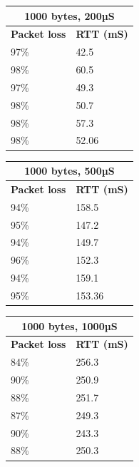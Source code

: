 \documentclass[11pt]{article}
\begin{document}
\begin{enumerate}[label=(\alph*)]
{	
\begin{tabular}{|l|l|}
\multicolumn{2}{c}{1000 bytes, 200µS} \\
\hline
\textbf{Packet loss} & \textbf{RTT (mS)} \\ \hline
97\% & 42.5 \\
98\% & 60.5 \\
97\% & 49.3 \\
98\% & 50.7 \\
98\% & 57.3 \\
\hline
98\% & 52.06 \\ 
\hline
\end{tabular}
\begin{tabular}{|l|l|}
\multicolumn{2}{c}{1000 bytes, 500µS} \\
\hline
\textbf{Packet loss} & \textbf{RTT (mS)} \\ \hline
94\% & 158.5 \\
95\% & 147.2 \\
94\% & 149.7 \\
96\% & 152.3 \\
94\% & 159.1 \\
\hline
95\% & 153.36 \\
\hline
\end{tabular}
\begin{tabular}{|l|l|}
\multicolumn{2}{c}{1000 bytes, 1000µS} \\
\hline
\textbf{Packet loss} & \textbf{RTT (mS)} \\ \hline
84\% & 256.3 \\
90\% & 250.9 \\
88\% & 251.7 \\
87\% & 249.3 \\
90\% & 243.3 \\
\hline
88\% & 250.3 \\
\hline
\end{tabular}
	}
\end{enumerate}
\end{document}
